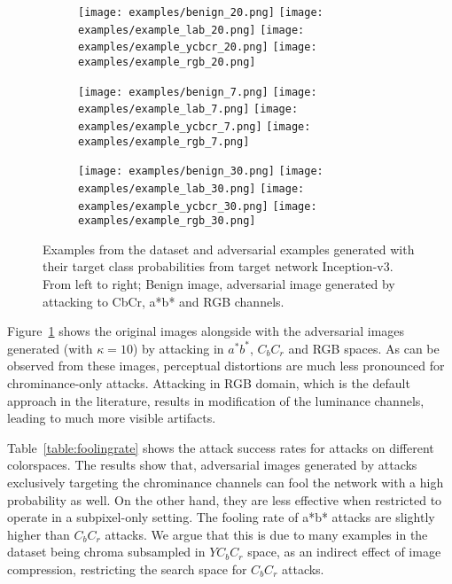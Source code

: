 \begin{figure}[ht]
    \ContinuedFloat
    \begin{subfigure}[b]{\linewidth}
        \caption{}
        \texttt{[image: examples/benign\_20.png]}
        \texttt{[image: examples/example\_lab\_20.png]}
        \texttt{[image: examples/example\_ycbcr\_20.png]}
        \texttt{[image: examples/example\_rgb\_20.png]}
    \end{subfigure}

    \begin{subfigure}[b]{\linewidth}
        \caption{}
        \texttt{[image: examples/benign\_7.png]}
        \texttt{[image: examples/example\_lab\_7.png]}
        \texttt{[image: examples/example\_ycbcr\_7.png]}
        \texttt{[image: examples/example\_rgb\_7.png]}
    \end{subfigure}

    \begin{subfigure}[b]{\linewidth}
        \caption{}
        \texttt{[image: examples/benign\_30.png]}
        \texttt{[image: examples/example\_lab\_30.png]}
        \texttt{[image: examples/example\_ycbcr\_30.png]}
        \texttt{[image: examples/example\_rgb\_30.png]}
    \end{subfigure}


    \caption[Examples from the dataset and adversarial examples generated with their target class probabilities from target network Inception-v3.]{Examples from the dataset and adversarial examples generated with their target class probabilities from target network Inception-v3. From left to right; Benign image, adversarial image generated by attacking to CbCr, a*b* and RGB channels. }\label{fig:visualprob}
\end{figure}

Figure~\ref{fig:visualprob} shows the original images alongside with the adversarial images generated (with \(\kappa = 10\)) by attacking in \(a^*b^*\), \(C_{b}C_{r}\) and RGB spaces. As can be observed from these images, perceptual distortions are much less pronounced for chrominance-only attacks. Attacking in RGB domain, which is the default approach in the literature, results in modification of the luminance channels, leading to much more visible artifacts.

Table~\ref*{table:foolingrate} shows the attack success rates for attacks on different colorspaces. The results show that, adversarial images generated by attacks exclusively targeting the chrominance channels can fool the network with a high probability as well. On the other hand, they are less effective when restricted to operate in a subpixel-only setting. The fooling rate of a*b* attacks are slightly higher than \(C_bC_r\) attacks. We argue that this is due to many examples in the dataset being chroma subsampled in \(YC_bC_r\) space, as an indirect effect of image compression, restricting the search space for \(C_bC_r\) attacks.

